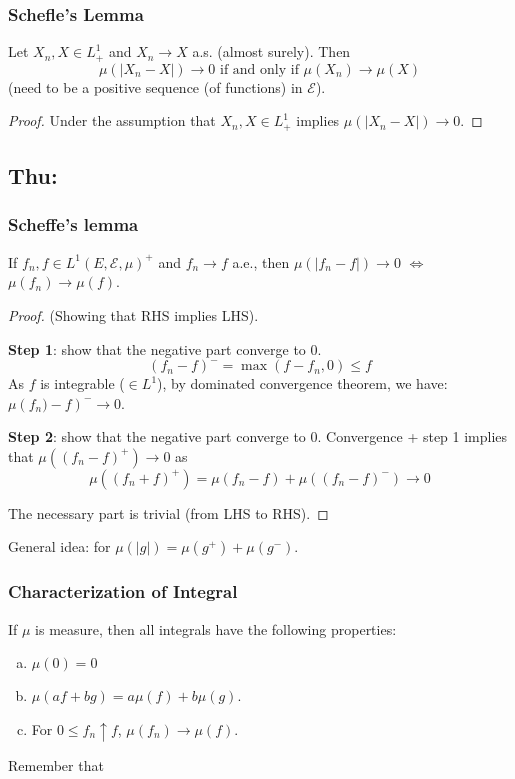 \documentclass[11pt]{article}
\newcommand{\m}{\mathcal}
\begin{document}
        \subsubsection{Schefle's Lemma}
        \label{lemma:schefle-negligible-differnece}
        Let $X_n, X \in L^1_+$ and $X_n \to X$ a.s. (almost surely). Then 
        \[
          \mu(|X_n - X|) \to 0 \text{ if and only if } \mu(X_n) \to \mu(X)
        \]
        (need to be a positive sequence (of functions) in $\m E$).
        \begin{proof}
          Under the assumption that $X_n, X \in L^1_+$ implies $\mu (|X_n - X|) \to 0$.
        \end{proof}

        \subsection{Thu:  }
        \subsubsection{Scheffe's lemma}
        If $f_n, f \in L^1 (E, \m E, \mu)^+$ and $f_n \to f$ a.e., then $\mu ( |f_n -
        f|) \to 0$ $\iff$ $\mu(f_n) \to \mu(f)$. 
        \begin{proof} (Showing that RHS implies LHS). 

          \textbf{Step 1}: show that the negative part converge to $0$. 
          \[
            (f_n - f)^- = \max (f - f_n, 0) \le f 
          \]
          As $f$ is integrable ($\in L^1$), by dominated convergence theorem, we have:
          $\mu\left( f_n) - f \right)^- \to 0$. 


          \textbf{Step 2}: show that the negative part converge to $0$. 
          Convergence + step 1 implies that $\mu(\left( f_n - f \right)^+ ) \to 0$ as 
          \[
            \mu\left( (f_n + f)^+ \right) = \mu(f_n - f) + \mu (( f_n - f)^-) \to 0
          \]

          The necessary part is trivial (from LHS to RHS).

        \end{proof}
        General idea: for $\mu(|g|) = \mu(g^+) + \mu(g^-)$. 


        \subsubsection{Characterization of Integral}
        If $\mu$ is measure, then all integrals have the following properties:
        \begin{enumerate}[(a)]
          \item $\mu(0) =0$
          \item $\mu ( a f+ bg ) = a \mu (f) +b \mu (g)$.
          \item For $0\le f_n \uparrow f$, $\mu(f_n) \to \mu(f)$.
        \end{enumerate}
        Remember that 
\end{document}
